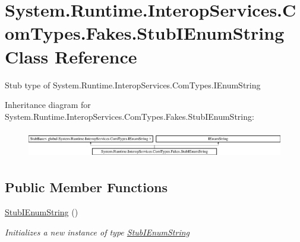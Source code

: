 \hypertarget{class_system_1_1_runtime_1_1_interop_services_1_1_com_types_1_1_fakes_1_1_stub_i_enum_string}{\section{System.\-Runtime.\-Interop\-Services.\-Com\-Types.\-Fakes.\-Stub\-I\-Enum\-String Class Reference}
\label{class_system_1_1_runtime_1_1_interop_services_1_1_com_types_1_1_fakes_1_1_stub_i_enum_string}
}


Stub type of System.\-Runtime.\-Interop\-Services.\-Com\-Types.\-I\-Enum\-String 


Inheritance diagram for System.\-Runtime.\-Interop\-Services.\-Com\-Types.\-Fakes.\-Stub\-I\-Enum\-String\-:\begin{figure}[H]
\begin{center}
\leavevmode
\includegraphics[height=1.244444cm]{class_system_1_1_runtime_1_1_interop_services_1_1_com_types_1_1_fakes_1_1_stub_i_enum_string}
\end{center}
\end{figure}
\subsection*{Public Member Functions}
\begin{DoxyCompactItemize}
\item 
\hyperlink{class_system_1_1_runtime_1_1_interop_services_1_1_com_types_1_1_fakes_1_1_stub_i_enum_string_a2c944de7554e23bf53e38918218942dc}{Stub\-I\-Enum\-String} ()
\begin{DoxyCompactList}\small\item\em Initializes a new instance of type \hyperlink{class_system_1_1_runtime_1_1_interop_services_1_1_com_types_1_1_fakes_1_1_stub_i_enum_string}{Stub\-I\-Enum\-String}\end{DoxyCompactList}\end{DoxyCompactItemize}
